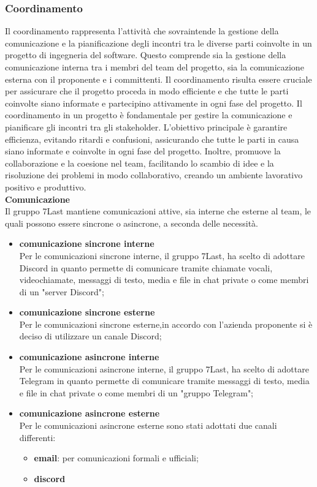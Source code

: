 \subsubsection{Coordinamento}
Il coordinamento rappresenta l’attività che sovraintende la gestione della comunicazione e la pianificazione degli incontri tra le diverse parti coinvolte in un progetto di ingegneria del software. Questo comprende sia la gestione della comunicazione interna tra i membri del team del progetto, sia la comunicazione esterna con il proponente e i committenti. Il coordinamento risulta essere cruciale per assicurare che il progetto proceda in modo efficiente e che tutte le parti coinvolte siano informate e partecipino attivamente in ogni fase del progetto.
Il coordinamento in un progetto è fondamentale per gestire la comunicazione e pianificare gli incontri tra gli stakeholder. L’obiettivo principale è garantire efficienza, evitando ritardi e confusioni, assicurando che tutte le parti in causa siano informate e coinvolte in ogni fase del progetto. Inoltre, promuove la collaborazione e la coesione nel team, facilitando lo scambio di idee e la risoluzione dei problemi in modo collaborativo, creando un ambiente lavorativo positivo e produttivo.\\
\textbf{Comunicazione}\\
Il gruppo 7Last mantiene comunicazioni attive, sia interne che esterne al team, le quali possono essere sincrone o asincrone, a seconda delle necessità.
\begin{itemize}
    \item \textbf{comunicazione sincrone interne}\\Per le comunicazioni sincrone interne, il gruppo 7Last, ha scelto di adottare Discord in quanto permette di comunicare tramite chiamate vocali, videochiamate, messaggi di testo, media e file in chat private o come membri di un "server Discord";
    \item \textbf{comunicazione sincrone esterne}\\Per le comunicazioni sincrone esterne,in accordo con l’azienda proponente si è deciso di utilizzare un canale Discord;
\end{itemize}
\begin{itemize}
    \item \textbf{comunicazione asincrone interne}\\Per le comunicazioni asincrone interne, il gruppo 7Last, ha scelto di adottare Telegram in quanto permette di comunicare tramite messaggi di testo, media e file in chat private o come membri di un "gruppo Telegram";
    \item \textbf{comunicazione asincrone esterne}\\Per le comunicazioni asincrone esterne sono stati adottati due canali differenti:
        \begin{itemize}
            \item \textbf{email}: per comunicazioni formali e ufficiali;
            \item \textbf{discord}
        \end{itemize}
\end{itemize}
